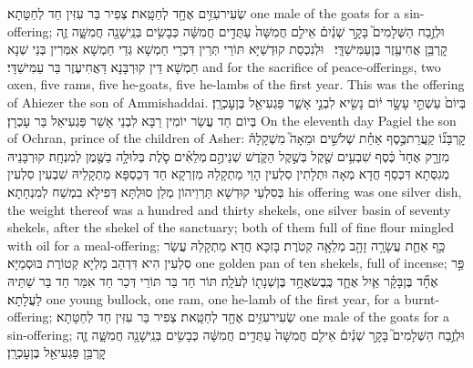 {שְׂעִיר\maqqaf עִזִּ֥ים אֶחָ֖ד לְחַטָּֽאת׃}
{צְפִיר בַּר עִזִּין חַד לְחַטָּתָא׃}
{one male of the goats for a sin-offering;}{}
{וּלְזֶ֣בַח הַשְּׁלָמִים֮ בָּקָ֣ר שְׁנַ֒יִם֒ אֵילִ֤ם חֲמִשָּׁה֙ עַתֻּדִ֣ים חֲמִשָּׁ֔ה כְּבָשִׂ֥ים בְּנֵֽי\maqqaf שָׁנָ֖ה חֲמִשָּׁ֑ה זֶ֛ה קׇרְבַּ֥ן אֲחִיעֶ֖זֶר בֶּן\maqqaf עַמִּישַׁדָּֽי׃ \petucha }
{וּלְנִכְסַת קוּדְשַׁיָּא תּוֹרֵי תְּרֵין דִּכְרֵי חַמְשָׁא גְּדֵי חַמְשָׁא אִמְּרִין בְּנֵי שְׁנָא חַמְשָׁא דֵּין קוּרְבָּנָא דַּאֲחִיעֶזֶר בַּר עַמִּישַׁדָּי׃}
{and for the sacrifice of peace-offerings, two oxen, five rams, five he-goats, five he-lambs of the first year. This was the offering of Ahiezer the son of Ammishaddai.}{}
{בְּיוֹם֙ עַשְׁתֵּ֣י עָשָׂ֣ר י֔וֹם נָשִׂ֖יא לִבְנֵ֣י אָשֵׁ֑ר פַּגְעִיאֵ֖ל בֶּן\maqqaf עׇכְרָֽן׃}
{בְּיוֹם חַד עֲשַׂר יוֹמִין רַבָּא לִבְנֵי אָשֵׁר פַּגְעִיאֵל בַּר עָכְרָן׃}
{On the eleventh day Pagiel the son of Ochran, prince of the children of Asher:}{}
{קׇרְבָּנ֞וֹ קַֽעֲרַת\maqqaf כֶּ֣סֶף אַחַ֗ת שְׁלֹשִׁ֣ים וּמֵאָה֮ מִשְׁקָלָהּ֒ מִזְרָ֤ק אֶחָד֙ כֶּ֔סֶף שִׁבְעִ֥ים שֶׁ֖קֶל בְּשֶׁ֣קֶל הַקֹּ֑דֶשׁ שְׁנֵיהֶ֣ם \legarmeh  מְלֵאִ֗ים סֹ֛לֶת בְּלוּלָ֥ה בַשֶּׁ֖מֶן לְמִנְחָֽה׃}
{קוּרְבָּנֵיהּ מְגִסְּתָא דִּכְסַף חֲדָא מְאָה וּתְלָתִין סִלְעִין הָוֵי מַתְקָלַהּ מִזְרְקָא חַד דְּכַסְפָּא מַתְקָלֵיהּ שִׁבְעִין סִלְעִין בְּסִלְעֵי קוּדְשָׁא תַּרְוֵיהוֹן מְלַן סוּלְתָּא דְּפִילָא בִמְשַׁח לְמִנְחָתָא׃}
{his offering was one silver dish, the weight thereof was a hundred and thirty shekels, one silver basin of seventy shekels, after the shekel of the sanctuary; both of them full of fine flour mingled with oil for a meal-offering;}{}
{כַּ֥ף אַחַ֛ת עֲשָׂרָ֥ה זָהָ֖ב מְלֵאָ֥ה קְטֹֽרֶת׃}
{בָּזִכָּא חֲדָא מַתְקָלַהּ עֲשַׂר סִלְעִין הִיא דִּדְהַב מַלְיָא קְטוֹרֶת בּוּסְמַיָּא׃}
{one golden pan of ten shekels, full of incense;}{}
{פַּ֣ר אֶחָ֞ד בֶּן\maqqaf בָּקָ֗ר אַ֧יִל אֶחָ֛ד כֶּֽבֶשׂ\maqqaf אֶחָ֥ד בֶּן\maqqaf שְׁנָת֖וֹ לְעֹלָֽה׃}
{תּוֹר חַד בַּר תּוֹרֵי דְּכַר חַד אִמַּר חַד בַּר שַׁתֵּיהּ לַעֲלָתָא׃}
{one young bullock, one ram, one he-lamb of the first year, for a burnt-offering;}{}
{שְׂעִיר\maqqaf עִזִּ֥ים אֶחָ֖ד לְחַטָּֽאת׃}
{צְפִיר בַּר עִזִּין חַד לְחַטָּתָא׃}
{one male of the goats for a sin-offering;}{}
{וּלְזֶ֣בַח הַשְּׁלָמִים֮ בָּקָ֣ר שְׁנַ֒יִם֒ אֵילִ֤ם חֲמִשָּׁה֙ עַתֻּדִ֣ים חֲמִשָּׁ֔ה כְּבָשִׂ֥ים בְּנֵֽי\maqqaf שָׁנָ֖ה חֲמִשָּׁ֑ה זֶ֛ה קׇרְבַּ֥ן פַּגְעִיאֵ֖ל בֶּן\maqqaf עׇכְרָֽן׃ \petucha }
